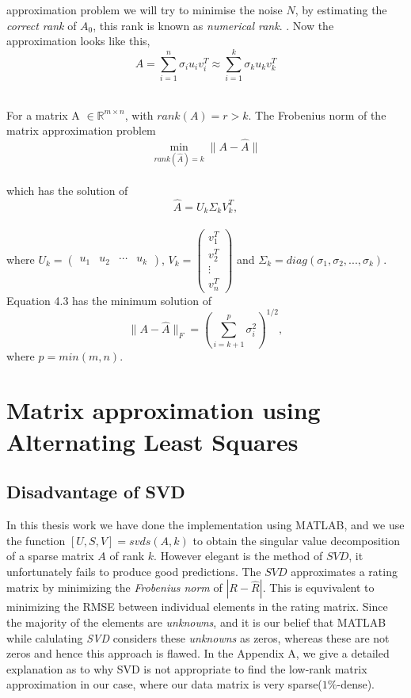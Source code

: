 approximation problem we will try to minimise the noise $N$, by estimating the
\emph{correct rank} of $A_0$, this rank is known as \emph{numerical rank}.
\cite{eld-mm:07}. Now the approximation looks like this, \\
\[
 A = \sum_{i=1}^{n}\sigma_i u_i v_i^T \approx \sum_{i=1}^{k}\sigma_k u_k v_k^T
\]\\
\begin{theorem}
 For a matrix A $\in \mathbb{R}^{m \times n}$, with $rank(A)=r>k$. The Frobenius
norm of the matrix approximation problem \\
\begin{equation}
 \min_{rank(\hat{A})=k}\|{A-\hat{A}}\|
\end{equation}\\
which has the solution of 
\begin{equation}
 \hat{A}=U_k \Sigma_{k} V_k^T,
\end{equation}\\
where $U_k = \begin{pmatrix}u_1&u_2&\cdots&u_k\end{pmatrix}$, $V_k=
\begin{pmatrix}v_1^T\\v_2^T\\\vdots\\v_n^T\end{pmatrix}$ and
$\Sigma_k=diag(\sigma_1,\sigma_2,...,\sigma_k)$. Equation 4.3 has the minimum
solution of
\begin{equation}
 \|{A-\hat{A}}\|_{F}=\left(\sum_{i=k+1}^{p}\sigma_i^2\right)^{1/2},
\end{equation}
where $p=min(m,n)$.
\end{theorem}

\section{Matrix approximation using Alternating Least Squares}
\subsection{Disadvantage of SVD}
In this thesis work we have done the implementation using MATLAB, and we use the
function $[U,S,V]=svds(A,k)$ to obtain the singular value decomposition of a
sparse matrix $A$ of rank $k$. However elegant is the method of $SVD$, it
unfortunately fails to produce good predictions. The $SVD$ approximates a rating
matrix by minimizing the \emph{Frobenius norm} of $|R-\hat{R}|$. This is
equvivalent to minimizing the RMSE between individual elements in the rating
matrix. Since the majority of the elements are \emph{unknowns}, and it is our
belief that MATLAB while calulating \emph{SVD} considers these \emph{unknowns}
as zeros, whereas these are not zeros and hence this approach is flawed.
In the Appendix A, we give a detailed explanation as to why SVD is not
appropriate to find the low-rank matrix approximation in our case, where our
data matrix is very sparse($1\%$-dense). 

